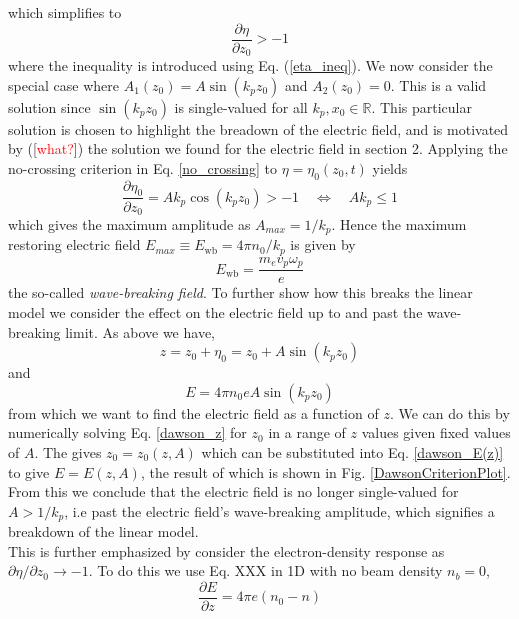 which simplifies to
\begin{equation}
\frac{\partial \eta}{\partial z_0}>-1
\label{no_crossing}
\end{equation}
where the inequality is introduced using Eq. (\ref{eta_ineq}). We now consider the special case where $A_1(z_0)=A\sin(k_pz_0)$ and $A_2(z_0)=0$. This is a valid solution since $\sin(k_pz_0)$ is single-valued for all $k_p,x_0\in\mathbb{R}$. This particular solution is chosen to highlight the breadown of the electric field, and is motivated by ([\textcolor{red}{what?}]) the solution we found for the electric field in section 2. Applying the no-crossing criterion in Eq. \ref{no_crossing} to $\eta=\eta_0(z_0,t)$ yields
\begin{equation}
\frac{\partial \eta_0}{\partial z_0}=Ak_p\cos(k_pz_0)>-1 \quad \Leftrightarrow \quad Ak_p\leq 1
\end{equation}
which gives the maximum amplitude as $A_{max}=1/k_p$. Hence the maximum restoring electric field $E_{max}\equiv E_{\text{wb}}=4\pi n_0/k_p$ is given by
\begin{equation}
E_{\text{wb}}=\frac{m_ev_p\omega_p}{e}
\end{equation}
the so-called \textit{wave-breaking field}. To further show how this breaks the linear model we consider the effect on the electric field up to and past the wave-breaking limit. As above we have, 
\begin{equation}
z=z_0+\eta_0=z_0+A\sin(k_p z_0)
\label{dawson_z}
\end{equation}
and 
\begin{equation}
E=4\pi n_0e A\sin(k_p z_0)
\label{dawson_E(z)}
\end{equation}
from which we want to find the electric field as a function of $z$. We can do this by numerically solving Eq. \ref{dawson_z} for $z_0$ in a range of $z$ values given fixed values of $A$. The gives $z_0=z_0(z,A)$ which can be substituted into Eq. \ref{dawson_E(z)} to give $E=E(z,A)$, the result of which is shown in Fig. \ref{DawsonCriterionPlot}. From this we conclude that the electric field is no longer single-valued for $A>1/k_p$, i.e past the electric field's wave-breaking amplitude, which signifies a breakdown of the linear model.\\
This is further emphasized by consider the electron-density response as $\partial \eta/\partial z_0\to -1$. To do this we use  Eq. XXX in 1D with no beam density $n_b=0$, 
\begin{equation}
\frac{\partial E}{\partial z}=4\pi e(n_0-n)
\end{equation}
